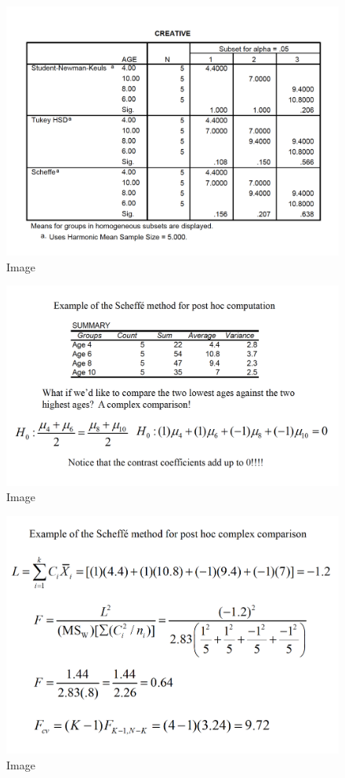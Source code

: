 \documentclass[]{book}
\theoremstyle{definition}
\theoremstyle{definition}
\theoremstyle{definition}
\theoremstyle{remark}
\begin{document}
\begin{figure}
\centering
\includegraphics{img/hicksphc13.png}
\caption{Image}
\end{figure}

\begin{figure}
\centering
\includegraphics{img/hicksphc14.png}
\caption{Image}
\end{figure}

\begin{figure}
\centering
\includegraphics{img/hicksphc15.png}
\caption{Image}
\end{figure}
\end{document}
